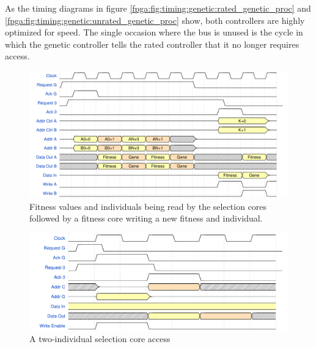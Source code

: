 As the timing diagrams in figure \vref{fpga:fig:timing:genetic:rated_genetic_proc} and \vref{fpga:fig:timing:genetic:unrated_genetic_proc} show, both controllers are highly optimized for speed. The single occasion where the bus is unused is the cycle in which the \gls{genetic controller} tells the \gls{rated controller} that it no longer requires access.

\begin{figure}[H]
  \centering
  \includegraphics[width=\textwidth]{fpga/fig/timing/rated_genetic_proc.pdf}
  \caption{Fitness values and individuals being read by the selection cores followed by a fitness core writing a new fitness and individual.}
  \label{fpga:fig:timing:genetic:rated_genetic_proc}
\end{figure}

\begin{figure}[H]
  \centering
  \includegraphics[width=\textwidth]{fpga/fig/timing/unrated_genetic_proc.pdf}
  \caption{A two-individual selection core access }
  \label{fpga:fig:timing:genetic:unrated_genetic_proc}
\end{figure}

